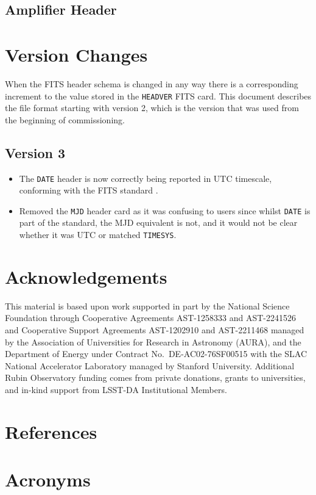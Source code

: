 \documentclass[OPS,lsstdraft,authoryear,toc]{lsstdoc}
\begin{document}
\subsection{Amplifier Header}



\appendix

\section{Version Changes}

When the FITS header schema is changed in any way there is a corresponding increment to the value stored in the \texttt{HEADVER} FITS card.
This document describes the file format starting with version 2, which is the version that was used from the beginning of commissioning.

\subsection{Version 3}

\begin{itemize}
\item The \texttt{DATE} header is now correctly being reported in UTC timescale, conforming with the FITS standard \citep{2010A&A...524A..42P}.
\item Removed the \texttt{MJD} header card as it was confusing to users since whilst \texttt{DATE} is part of the standard, the MJD equivalent is not, and it would not be clear whether it was UTC or matched \texttt{TIMESYS}.
\end{itemize}

\section{Acknowledgements}

This material is based upon work supported in part by the National Science Foundation through Cooperative Agreements AST-1258333 and AST-2241526 and Cooperative Support Agreements AST-1202910 and AST-2211468 managed by the Association of Universities for Research in Astronomy (AURA), and the Department of Energy under Contract No.\ DE-AC02-76SF00515 with the SLAC National Accelerator Laboratory managed by Stanford University.
Additional Rubin Observatory funding comes from private donations, grants to universities, and in-kind support from LSST-DA Institutional Members.

\section{References} \label{sec:bib}
\renewcommand{\refname}{} %


\section{Acronyms} \label{sec:acronyms}

\end{document}

